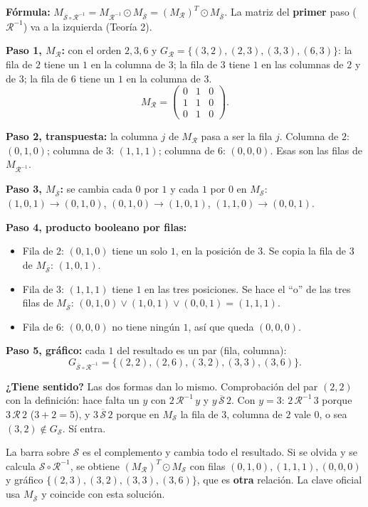 \documentclass[11pt]{article}
\newcommand{\R}{\mathcal R}
\newcommand{\Sc}{\mathcal S}
\newcommand{\Sb}{\overline{\mathcal S}}
\begin{document}
\begin{explica}
\textbf{Fórmula:} $M_{\Sb\circ\R^{-1}}=M_{\R^{-1}}\odot M_{\Sb}=(M_\R)^T\odot M_{\Sb}$. La matriz del \textbf{primer} paso ($\R^{-1}$) va a la izquierda (Teoría 2).

\textbf{Paso 1, $M_\R$:} con el orden $2,3,6$ y $G_\R=\{(3,2),(2,3),(3,3),(6,3)\}$: la fila de $2$ tiene un $1$ en la columna de $3$; la fila de $3$ tiene $1$ en las columnas de $2$ y de $3$; la fila de $6$ tiene un $1$ en la columna de $3$.
\[M_\R=\begin{pmatrix}0&1&0\\1&1&0\\0&1&0\end{pmatrix}.\]

\textbf{Paso 2, transpuesta:} la columna $j$ de $M_\R$ pasa a ser la fila $j$. Columna de $2$: $(0,1,0)$; columna de $3$: $(1,1,1)$; columna de $6$: $(0,0,0)$. Esas son las filas de $M_{\R^{-1}}$.

\textbf{Paso 3, $M_{\Sb}$:} se cambia cada $0$ por $1$ y cada $1$ por $0$ en $M_\Sc$: $(1,0,1)\to(0,1,0)$, $(0,1,0)\to(1,0,1)$, $(1,1,0)\to(0,0,1)$.

\textbf{Paso 4, producto booleano por filas:}
\begin{itemize}[leftmargin=1.3em,itemsep=2pt]
\item Fila de $2$: $(0,1,0)$ tiene un solo $1$, en la posición de $3$. Se copia la fila de $3$ de $M_{\Sb}$: $(1,0,1)$.
\item Fila de $3$: $(1,1,1)$ tiene $1$ en las tres posiciones. Se hace el ``o'' de las tres filas de $M_{\Sb}$: $(0,1,0)\vee(1,0,1)\vee(0,0,1)=(1,1,1)$.
\item Fila de $6$: $(0,0,0)$ no tiene ningún $1$, así que queda $(0,0,0)$.
\end{itemize}

\textbf{Paso 5, gráfico:} cada $1$ del resultado es un par (fila, columna):
\[G_{\Sb\circ\R^{-1}}=\{(2,2),(2,6),(3,2),(3,3),(3,6)\}.\]

\textbf{¿Tiene sentido?} Las dos formas dan lo mismo. Comprobación del par $(2,2)$ con la definición: hace falta un $y$ con $2\,\R^{-1}\,y$ y $y\,\Sb\,2$. Con $y=3$: $2\,\R^{-1}\,3$ porque $3\,\R\,2$ ($3+2=5$), y $3\,\Sb\,2$ porque en $M_\Sc$ la fila de $3$, columna de $2$ vale $0$, o sea $(3,2)\notin G_\Sc$. Sí entra.
\end{explica}

\begin{nota}
La barra sobre $\Sc$ es el complemento y cambia todo el resultado. Si se olvida y se calcula $\Sc\circ\R^{-1}$, se obtiene $(M_\R)^T\odot M_\Sc$ con filas $(0,1,0),(1,1,1),(0,0,0)$ y gráfico $\{(2,3),(3,2),(3,3),(3,6)\}$, que es \textbf{otra} relación. La clave oficial usa $M_{\Sb}$ y coincide con esta solución.
\end{nota}
\end{document}
